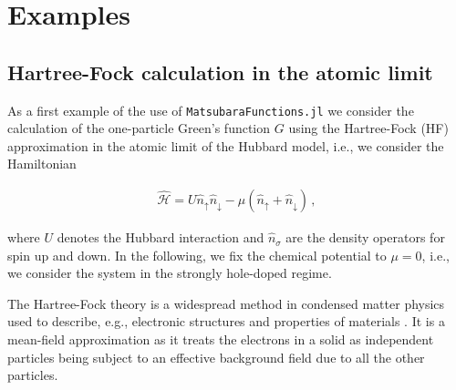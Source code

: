 \documentclass{SciPost}
\begin{document}
\section{Examples}
\label{sec:example}

\subsection{Hartree-Fock calculation in the atomic limit}
\label{subsec:HF}

As a first example of the use of \texttt{MatsubaraFunctions.jl} we consider the calculation of the one-particle Green's function $G$ using the Hartree-Fock (HF) approximation in the atomic limit of the Hubbard model, i.e., we consider the Hamiltonian
%
\begin{linenomath}
    \begin{align}
        \hat{\mathcal{H}} = U \hat{n}_{\uparrow} \hat{n}_{\downarrow} - \mu (\hat{n}_{\uparrow} + \hat{n}_{\downarrow}) \,,
    \end{align}
\end{linenomath}
%
where $U$ denotes the Hubbard interaction and $\hat{n}_\sigma$ are the density operators for spin up and down. In the following, we fix the chemical potential to $\mu = 0$, i.e., we consider the system in the strongly hole-doped regime. 

The Hartree-Fock theory \cite{hartree_1928, fock_naherungsmethode_1930, PhysRev.81.385} is a widespread method in condensed matter physics used to describe, e.g., electronic structures and properties of materials \cite{BAERENDS197341, NEESE200998}. It is a mean-field approximation as it treats the electrons in a solid as independent particles being subject to an effective background field due to all the other particles.
\end{document}
